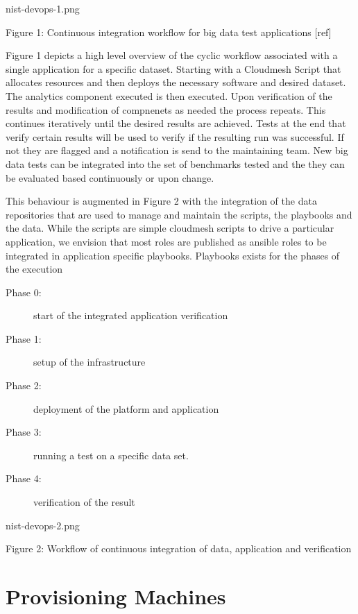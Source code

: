 \documentclass[9pt,twocolumn,twoside]{styles/osajnl}
\begin{document}
 nist-devops-1.png 



Figure 1: Continuous integration workflow for big data test applications [ref]


Figure 1 depicts a high level overview of the cyclic workflow associated with a single application for a specific dataset. Starting with a Cloudmesh Script that allocates resources and then deploys the necessary software and desired dataset. The analytics component executed is then executed. Upon verification of the results and modification of compnenets as needed the process repeats. This continues iteratively until the desired results are achieved. Tests at the end that verify certain results will be used to verify if the resulting run was successful. If not they are flagged and a notification is send to the maintaining team. New big data tests can be integrated into the set of benchmarks tested and the they can be evaluated based continuously or upon change. 


This behaviour is augmented in Figure 2 with the integration of the data repositories that are used to manage and maintain the scripts, the playbooks and the data. While the scripts are simple cloudmesh scripts to drive a particular application, we envision that most roles are published as ansible roles to be integrated in application specific playbooks. Playbooks exists for the  phases of the execution

\begin{description}
\item[Phase 0:] start of the integrated application verification
\item[Phase 1:] setup of the infrastructure 
\item[Phase 2:] deployment of the platform and application
\item[Phase 3:] running a test on a specific data set.
\item[Phase 4:] verification of the result
\end{description}

 nist-devops-2.png 



Figure 2: Workflow of continuous integration of data, application and verification


\section{Provisioning Machines}
\end{document}
